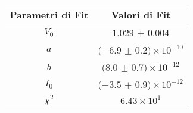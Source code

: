\begin{tabular}{cc}
\hline
	Parametri di Fit & Valori di Fit\\ 
\hline
	$V_0$ & $1.029$ $\pm$ $0.004$ \\
	$a$ & $(-6.9$ $\pm$ $0.2)\times 10^{-10}$ \\
	$b$ & $(8.0$ $\pm$ $0.7)\times 10^{-12}$ \\
	$I_0$ & $(-3.5$ $\pm$ $0.9)\times 10^{-12}$ \\
	$\chi^2$ & $6.43\times 10^{1}$ \\
\hline
\end{tabular}
